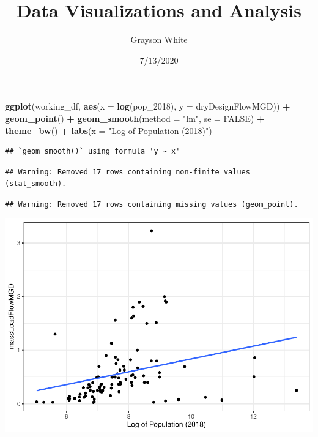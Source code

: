 \documentclass[
]{article}
\title{Data Visualizations and Analysis}
\author{Grayson White}
\date{7/13/2020}
\newenvironment{Shaded}{\begin{snugshade}}{\end{snugshade}}
\newcommand{\DataTypeTok}[1]{\textcolor[rgb]{0.13,0.29,0.53}{#1}}
\newcommand{\DecValTok}[1]{\textcolor[rgb]{0.00,0.00,0.81}{#1}}
\newcommand{\KeywordTok}[1]{\textcolor[rgb]{0.13,0.29,0.53}{\textbf{#1}}}
\newcommand{\NormalTok}[1]{#1}
\newcommand{\OperatorTok}[1]{\textcolor[rgb]{0.81,0.36,0.00}{\textbf{#1}}}
\newcommand{\OtherTok}[1]{\textcolor[rgb]{0.56,0.35,0.01}{#1}}
\newcommand{\StringTok}[1]{\textcolor[rgb]{0.31,0.60,0.02}{#1}}
\begin{document}
\maketitle

\begin{Shaded}
\begin{Highlighting}[]
\KeywordTok{ggplot}\NormalTok{(working_df, }\KeywordTok{aes}\NormalTok{(}\DataTypeTok{x =} \KeywordTok{log}\NormalTok{(pop_}\DecValTok{2018}\NormalTok{), }\DataTypeTok{y =}\NormalTok{ dryDesignFlowMGD)) }\OperatorTok{+}
\StringTok{  }\KeywordTok{geom_point}\NormalTok{() }\OperatorTok{+}
\StringTok{  }\KeywordTok{geom_smooth}\NormalTok{(}\DataTypeTok{method =} \StringTok{"lm"}\NormalTok{, }\DataTypeTok{se =} \OtherTok{FALSE}\NormalTok{) }\OperatorTok{+}
\StringTok{  }\KeywordTok{theme_bw}\NormalTok{() }\OperatorTok{+}
\StringTok{  }\KeywordTok{labs}\NormalTok{(}\DataTypeTok{x =} \StringTok{"Log of Population (2018)"}\NormalTok{)}
\end{Highlighting}
\end{Shaded}

\begin{verbatim}
## `geom_smooth()` using formula 'y ~ x'
\end{verbatim}

\begin{verbatim}
## Warning: Removed 17 rows containing non-finite values (stat_smooth).
\end{verbatim}

\begin{verbatim}
## Warning: Removed 17 rows containing missing values (geom_point).
\end{verbatim}

\includegraphics{data-viz_files/figure-latex/unnamed-chunk-2-1.pdf}
\end{document}
